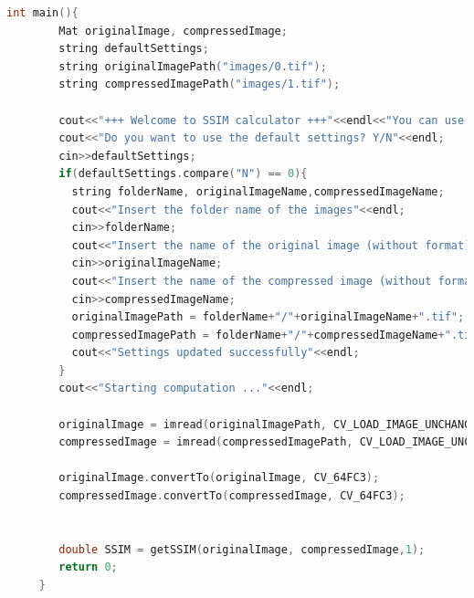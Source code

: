 \documentclass[a4paper,11pt]{article}
\begin{document}
    \begin{lstlisting}[language=C++]
    int main(){   
        Mat originalImage, compressedImage;
        string defaultSettings;
        string originalImagePath("images/0.tif");
        string compressedImagePath("images/1.tif");
        
        cout<<"+++ Welcome to SSIM calculator +++"<<endl<<"You can use this program to calculate how much similar are two TIFF images with the same subject"<<endl;
        cout<<"Do you want to use the default settings? Y/N"<<endl;
        cin>>defaultSettings;
        if(defaultSettings.compare("N") == 0){
          string folderName, originalImageName,compressedImageName;
          cout<<"Insert the folder name of the images"<<endl;
          cin>>folderName;
          cout<<"Insert the name of the original image (without format)"<<endl;
          cin>>originalImageName;
          cout<<"Insert the name of the compressed image (without format)"<<endl;
          cin>>compressedImageName;
          originalImagePath = folderName+"/"+originalImageName+".tif";
          compressedImagePath = folderName+"/"+compressedImageName+".tif";
          cout<<"Settings updated successfully"<<endl;	
        }
        cout<<"Starting computation ..."<<endl;
      
        originalImage = imread(originalImagePath, CV_LOAD_IMAGE_UNCHANGED);
        compressedImage = imread(compressedImagePath, CV_LOAD_IMAGE_UNCHANGED);
      
        originalImage.convertTo(originalImage, CV_64FC3);
        compressedImage.convertTo(compressedImage, CV_64FC3);
      
      
        double SSIM = getSSIM(originalImage, compressedImage,1);
        return 0;
     }
    \end{lstlisting}

    \newpage
\end{document}
